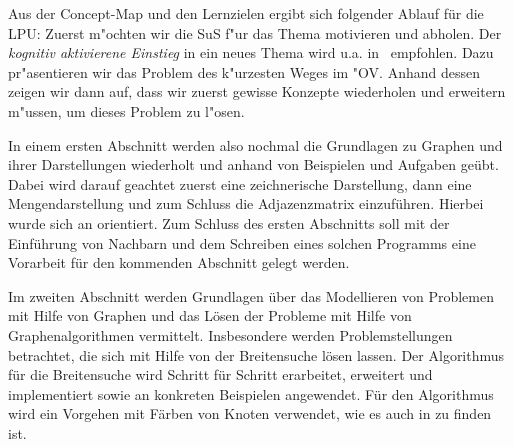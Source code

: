 Aus der Concept-Map und den Lernzielen ergibt sich folgender Ablauf für die LPU:
Zuerst m"ochten wir die SuS f"ur das Thema motivieren und abholen.
Der \emph{kognitiv aktivierene Einstieg} in ein neues Thema wird u.a. in~\cite{stern1} empfohlen.
Dazu pr"asentieren wir das Problem des k"urzesten Weges im "OV. 
Anhand dessen zeigen wir dann auf, dass wir zuerst gewisse Konzepte wiederholen und erweitern m"ussen, um dieses Problem zu l"osen.

In einem ersten Abschnitt werden also nochmal die Grundlagen zu Graphen und ihrer Darstellungen wiederholt und anhand von Beispielen und Aufgaben geübt. 
Dabei wird darauf geachtet zuerst eine zeichnerische Darstellung, dann eine Mengendarstellung und zum Schluss die Adjazenzmatrix einzuführen. 
Hierbei wurde sich an \cite{cormen,ottmann} orientiert.
Zum Schluss des ersten Abschnitts soll mit der Einführung von Nachbarn und dem Schreiben eines solchen Programms eine Vorarbeit für den kommenden Abschnitt gelegt werden.

Im zweiten Abschnitt werden Grundlagen \"uber das Modellieren von Problemen mit Hilfe von Graphen und das L\"osen der Probleme mit Hilfe von Graphenalgorithmen vermittelt. Insbesondere werden Problemstellungen betrachtet, die sich mit Hilfe von der Breitensuche l\"osen lassen. Der Algorithmus f\"ur die Breitensuche wird Schritt f\"ur Schritt erarbeitet, erweitert und implementiert sowie an konkreten Beispielen angewendet. F\"ur den Algorithmus wird ein Vorgehen mit F\"arben von Knoten verwendet, wie es auch in \cite{cormen} zu finden ist.